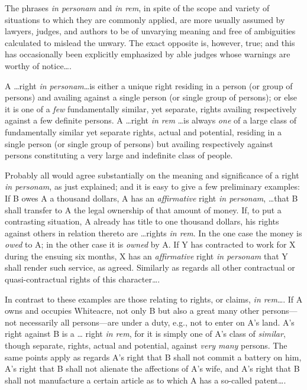
The phrases \textit{in personam} and \textit{in rem}, in spite of the scope and
variety of situations to which they are commonly applied, are more usually
assumed by lawyers, judges, and authors to be of unvarying meaning and free of
ambiguities calculated to mislead the unwary. The exact opposite is, however,
true; and this has occasionally been explicitly emphasized by able judges whose
warnings are worthy of notice\ldots.

A \ldots right \textit{in personam}\ldots is either a unique right residing
in a person (or group of persons) and availing against a single person (or
single group of persons); or else it is one of a \textit{few} fundamentally
similar, yet separate, rights availing respectively against a few definite
persons. A \ldots right \textit{in rem} \ldots is always \textit{one} of a
large class of fundamentally similar yet separate rights, actual and potential,
residing in a single person (or single group of persons) but availing
respectively against persons constituting a very large and indefinite class of
people.

Probably all would agree substantially on the meaning and significance of a
right \textit{in personam}, as just explained; and it is easy to give a few
preliminary examples: If B owes A a thousand dollars, A has an
\textit{affirmative} right \textit{in personam}, \ldots that B shall transfer
to A the legal ownership of that amount of money. If, to put a contrasting
situation, A already has title to one thousand dollars, his rights against
others in relation thereto are \ldots rights \textit{in rem}. In the one case
the money is \textit{owed} to A; in the other case it is \textit{owned} by A.
If Y has contracted to work for X during the ensuing six months, X has an
\textit{affirmative} right \textit{in personam} that Y shall render such
service, as agreed. Similarly as regards all other contractual or
quasi-contractual rights of this character\ldots.

In contrast to these examples are those relating to rights, or claims,
\textit{in rem}\ldots. If A owns and occupies Whiteacre, not
only B but also a great many other persons---not necessarily all persons---are
under a duty, e.g., not to enter on A's land. A's right against B is a \ldots
right \textit{in rem}, for it is simply one of A's class of \textit{similar},
though separate, rights, actual and potential, against \textit{very many}
persons. The same points apply as regards A's right that B shall not commit a
battery on him, A's right that B shall not alienate the affections of A's wife,
and A's right that B shall not manufacture a certain article as to which A has
a so-called patent\ldots.

